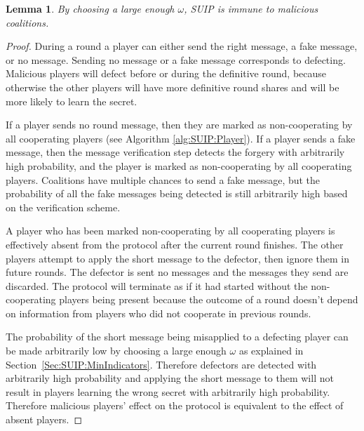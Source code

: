 \documentclass[12pt]{dalcsthesis}
\newtheorem{lemma}{Lemma}
\begin{document}
\begin{lemma}\label{Lem:SUIP:MaliciousImmune}By choosing a large enough $\omega$, SUIP is immune to malicious coalitions.\end{lemma}
\begin{proof}
During a round a player can either send the right message, a fake message, or no message. Sending no message or a fake message corresponds to defecting. Malicious players will defect before or during the definitive round, because otherwise the other players will have more definitive round shares and will be more likely to learn the secret.

If a player sends no round message, then they are marked as non-cooperating by all cooperating players (see Algorithm \ref{alg:SUIP:Player}). If a player sends a fake message, then the message verification step detects the forgery with arbitrarily high probability, and the player is marked as non-cooperating by all cooperating players. Coalitions have multiple chances to send a fake message, but the probability of all the fake messages being detected is still arbitrarily high based on the verification scheme.

A player who has been marked non-cooperating by all cooperating players is effectively absent from the protocol after the current round finishes. The other players attempt to apply the short message to the defector, then ignore them in future rounds. The defector is sent no messages and the messages they send are discarded. The protocol will terminate as if it had started without the non-cooperating players being present because the outcome of a round doesn't depend on information from players who did not cooperate in previous rounds.

The probability of the short message being misapplied to a defecting player can be made arbitrarily low by choosing a large enough $\omega$ as explained in Section~\ref{Sec:SUIP:MinIndicators}. Therefore defectors are detected with arbitrarily high probability and applying the short message to them will not result in players learning the wrong secret with arbitrarily high probability. Therefore malicious players' effect on the protocol is equivalent to the effect of absent players.
\end{proof}
\end{document}
